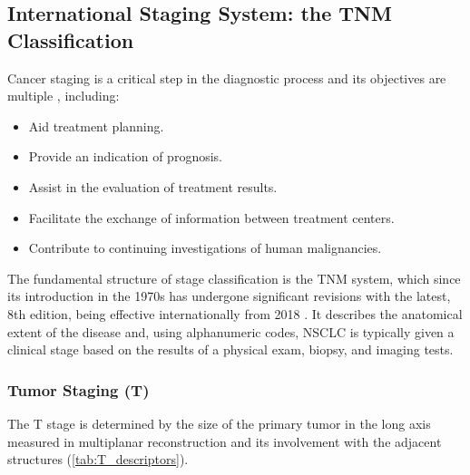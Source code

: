 \subsection{International Staging System: the TNM Classification}

Cancer staging is a critical step in the diagnostic process and its objectives are multiple \cite{TNM}, including:
\begin{itemize}
    \item Aid treatment planning.
    \item Provide an indication of prognosis.
    \item Assist in the evaluation of treatment results.
    \item Facilitate the exchange of information between treatment centers.
    \item Contribute to continuing investigations of human malignancies.
\end{itemize}

The fundamental structure of stage classification is the TNM system, which since its introduction in the 1970s has undergone significant revisions with the latest, 8th edition, being effective internationally from 2018 \cite{TNM_8th}. It describes the anatomical extent of the disease and, using alphanumeric codes, NSCLC is typically given a clinical stage based on the results of a physical exam, biopsy, and imaging tests.

\subsubsection{Tumor Staging (T)}

The T stage is determined by the size of the primary tumor in the long axis measured in multiplanar reconstruction and its involvement with the adjacent structures (\autoref{tab:T_descriptors}).


